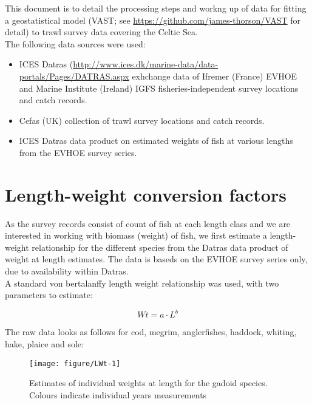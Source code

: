 \documentclass[12pt]{article}\usepackage[]{graphicx}\usepackage[]{color}
\makeatletter
\def\maxwidth{ %
  \ifdim\Gin@nat@width>\linewidth
    \linewidth
  \else
    \Gin@nat@width
  \fi
}
\newenvironment{knitrout}{}{} %
\makeatother
\begin{document}
\maketitle

This document is to detail the processing steps and workng up of data for fitting
a geostatistical model (VAST; see \url{https://github.com/james-thorson/VAST}
for detail) to trawl survey data covering the Celtic Sea. \\

The following data sources were used:

\begin{itemize}
	\item ICES Datras
		(\url{http://www.ices.dk/marine-data/data-portals/Pages/DATRAS.aspx}
		exhchange data of Ifremer (France) EVHOE and Marine Institute
		(Ireland) IGFS fisheries-independent survey locations and catch
		records.
	\item Cefas (UK) collection of trawl survey locations and catch
		records.
	\item ICES Datras data product on estimated weights of fish at various
		lengths from the EVHOE survey series.
\end{itemize}

\section{Length-weight conversion factors}

As the survey records consist of count of fish at each length class and we are
interested in working with biomass (weight) of fish, we first estimate a
length-weight relationship for the different species from the Datras data
product of weight at length estimates. The data is baseds on the EVHOE survey
series only, due to availability within Datras. \\

A standard von bertalanffy length weight relationship was used, with two
parameters to estimate:

\begin{equation}\label{eq:1}
	Wt = a \cdot L^b
\end{equation}

The raw data looks as follows for cod, megrim, anglerfishes, haddock, whiting,
hake, plaice and sole:

\begin{knitrout}\footnotesize
{}\color{fgcolor}\begin{figure}
\texttt{[image: figure/LWt-1]} \caption[Estimates of individual weights at length for the gadoid species]{Estimates of individual weights at length for the gadoid species. Colours indicate individual years measurements}\label{fig:LWt}
\end{figure}


\end{knitrout}
\end{document}
